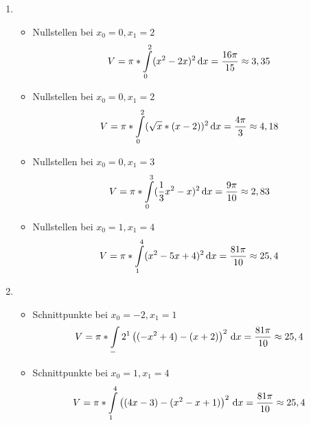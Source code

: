 \begin{lsg}{}
	\begin{enumerate}
		\item \begin{itemize}
			\item Nullstellen bei $x_0=0, x_1=2$
			\begin{equation*}
				V=\pi*\int\limits_0^2(x^2-2x)^2\,\mathrm{d} x =\frac {16\pi}{15}\approx 3,35
			\end{equation*}
			\item Nullstellen bei $x_0=0, x_1=2$
			\begin{equation*}
				V=\pi*\int\limits_0^2(\sqrt{x}*(x-2))^2\,\mathrm{d} x =\frac {4\pi}{3}\approx 4,18
			\end{equation*}
			\item Nullstellen bei $x_0=0, x_1=3$
			\begin{equation*}
				V=\pi*\int\limits_0^3(\frac 1 3 x^2-x)^2\,\mathrm{d} x =\frac {9\pi}{10}\approx 2,83
			\end{equation*}
			\item Nullstellen bei $x_0=1, x_1=4$
			\begin{equation*}
				V=\pi*\int\limits_1^4(x^2-5x+4)^2\,\mathrm{d} x =\frac {81\pi}{10}\approx 25,4
			\end{equation*}
		\end{itemize}
		\item \begin{itemize}
			\item Schnittpunkte bei $x_0=-2, x_1=1$
			\begin{equation*}
				V=\pi*\int\limits_-2^1\left((-x^2+4)-(x+2)\right)^2\,\mathrm{d} x =\frac {81\pi}{10}\approx 25,4
			\end{equation*}
			\item Schnittpunkte bei $x_0=1, x_1=4$
			\begin{equation*}
				V=\pi*\int\limits_1^4\left((4x-3)-(x^2-x+1)\right)^2\,\mathrm{d} x =\frac {81\pi}{10}\approx 25,4
			\end{equation*}
		\end{itemize}
	\end{enumerate}
\end{lsg}

